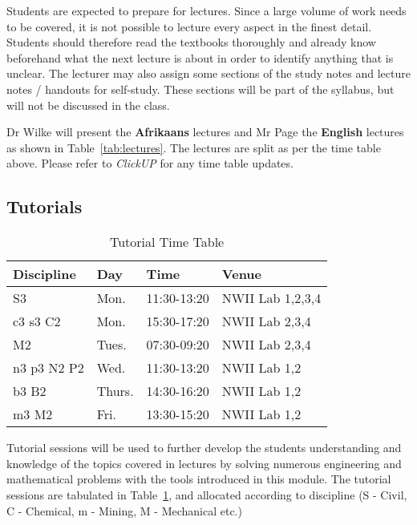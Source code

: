         Students are expected to prepare for lectures. Since a large volume of work
        needs to be covered, it is not possible to lecture every aspect in the
        finest detail. Students should therefore read the textbooks thoroughly
        and already know beforehand what the next lecture is about in order to
        identify anything that is unclear. The lecturer may also assign some
        sections of the study notes and lecture notes / handouts for self-study.
        These sections will be part of the syllabus, but will not be discussed
        in the class.

        Dr Wilke will present the \textbf{Afrikaans} lectures and Mr
        Page the \textbf{English} lectures as shown in
        Table~\ref{tab:lectures}. The lectures are split as per the
        time table above. Please refer to {\it ClickUP} for any time table
        updates.

    \subsection{Tutorials}
        \begin{table}[!h]
            \begin{center}
             \begin{tabular}{|l|l|l|l|}
                 \hline
                 {\bf Discipline} & {\bf Day} & {\bf Time} & {\bf Venue} \\
                 \hline
                 S3          & Mon.   & 11:30-13:20 & NWII Lab 1,2,3,4 \\
                 c3 s3 C2    & Mon.   & 15:30-17:20 & NWII Lab 2,3,4 \\
                 M2          & Tues.  & 07:30-09:20 & NWII Lab 2,3,4 \\
                 n3 p3 N2 P2 & Wed.   & 11:30-13:20 & NWII Lab 1,2 \\
                 b3 B2       & Thurs. & 14:30-16:20 & NWII Lab 1,2 \\
                 m3 M2       & Fri.   & 13:30-15:20 & NWII Lab 1,2 \\
                 \hline
             \end{tabular}
             \caption{Tutorial Time Table}
            \end{center}
            \label{tab:tutorials}
        \end{table}

        Tutorial sessions will be used to further develop the students
        understanding and knowledge of the topics covered in lectures
        by solving numerous engineering and mathematical problems with
        the tools introduced in this module. The tutorial sessions are
        tabulated in Table~\ref{tab:tutorials}, and allocated
        according to discipline (S - Civil, C - Chemical, m - Mining,
        M - Mechanical etc.)

